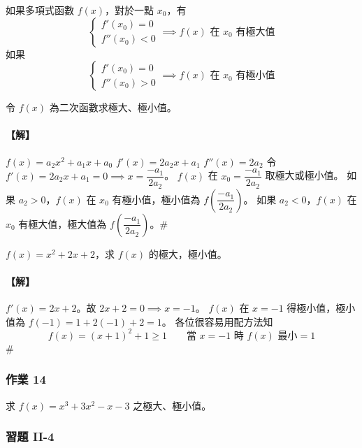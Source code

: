 \begin{theorem}[極值判別法]\label{thm:b6s-2-extrema}
如果多項式函數 $f(x)$，對於一點 $x_0$，有
\[ \begin{cases} f'(x_0) = 0 \\ f''(x_0) < 0 \end{cases} \implies f(x) \text{ 在 } x_0 \text{ 有極大值} \]
如果
\[ \begin{cases} f'(x_0) = 0 \\ f''(x_0) > 0 \end{cases} \implies f(x) \text{ 在 } x_0 \text{ 有極小值} \]
\end{theorem}

\begin{example}\label{ex:b6s-2-22}
令 $f(x)$ 為二次函數求極大、極小值。
\end{example}

\paragraph{【解】}
$f(x) = a_2 x^2 + a_1 x + a_0$
$f'(x) = 2a_2 x + a_1$
$f''(x) = 2a_2$
令 $f'(x) = 2a_2 x + a_1 = 0 \implies x = \dfrac{-a_1}{2a_2}$。
$f(x)$ 在 $x_0 = \dfrac{-a_1}{2a_2}$ 取極大或極小值。
如果 $a_2 > 0$，$f(x)$ 在 $x_0$ 有極小值，極小值為 $f\left(\dfrac{-a_1}{2a_2}\right)$。
如果 $a_2 < 0$，$f(x)$ 在 $x_0$ 有極大值，極大值為 $f\left(\dfrac{-a_1}{2a_2}\right)$。\hfill$\#$

\begin{example}\label{ex:b6s-2-23}
$f(x)=x^2+2x+2$，求 $f(x)$ 的極大，極小值。
\end{example}

\paragraph{【解】}
$f'(x)=2x+2$。故 $2x+2=0 \implies x=-1$。
$f(x)$ 在 $x=-1$ 得極小值，極小值為 $f(-1)=1+2(-1)+2=1$。
各位很容易用配方法知
\[ f(x) = (x+1)^2+1 \ge 1 \qquad \text{當 } x=-1 \text{ 時 } f(x) \text{ 最小}=1 \]\hfill$\#$

\subsubsection*{作業 14}\label{hw:b6s-2-14}
求 $f(x)=x^3+3x^2-x-3$ 之極大、極小值。

\subsubsection*{習題 II-4}\label{sec:b6s-ex2-4}

